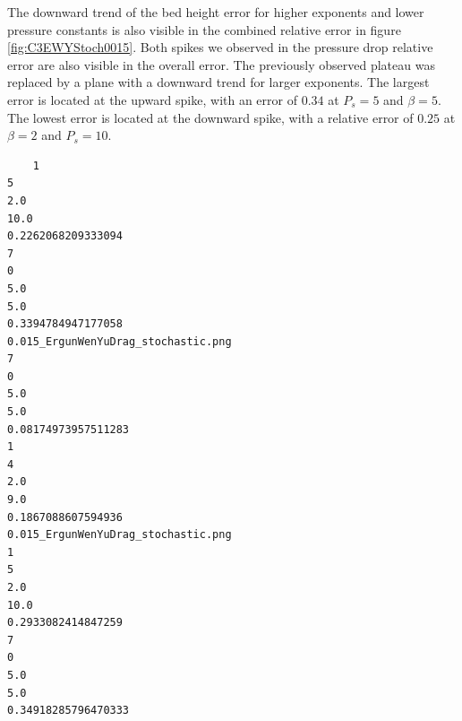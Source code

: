 The downward trend of the bed height error for higher exponents and lower pressure constants is also visible in the combined relative error in figure \ref{fig:C3EWYStoch0015}.
Both spikes we observed in the pressure drop relative error are also visible in the overall error.
The previously observed plateau was replaced by a plane with a downward trend for larger exponents.
The largest error is located at the upward spike, with an error of $0.34$ at $P_s = 5$ and $\beta = 5$.
The lowest error is located at the downward spike, with a relative error of $0.25$ at $\beta = 2$ and $P_s = 10$.


\ifcode
\begin{lstlisting}
    1
5
2.0
10.0
0.2262068209333094
7
0
5.0
5.0
0.3394784947177058
0.015_ErgunWenYuDrag_stochastic.png
7
0
5.0
5.0
0.08174973957511283
1
4
2.0
9.0
0.1867088607594936
0.015_ErgunWenYuDrag_stochastic.png
1
5
2.0
10.0
0.2933082414847259
7
0
5.0
5.0
0.34918285796470333
\end{lstlisting}
\fi

